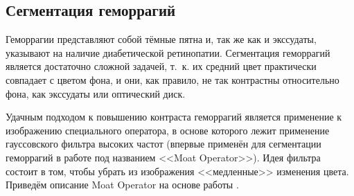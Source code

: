 \documentclass[12pt,fleqn]{article}
\begin{document}

\subsection{Сегментация геморрагий}
\label{subsection:hemorrhages}

Геморрагии представляют собой тёмные пятна и, так же как и экссудаты, указывают на наличие диабетической ретинопатии. Сегментация геморрагий является достаточно сложной задачей, т.~к. их средний цвет практически совпадает с цветом фона, и они, как правило, не так контрастны относительно фона, как экссудаты или оптический диск. 

Удачным подходом к повышению контраста геморрагий является применение к изображению специального оператора, в основе которого лежит применение гауссовского фильтра высоких частот (впервые применён для сегментации геморрагий в работе \cite{sinthanayothin} под названием <<Moat Operator>>). Идея фильтра состоит в том, чтобы убрать из изображения <<медленные>> изменения цвета. Приведём описание Moat Operator на основе работы \cite{jose}.
\end{document}
